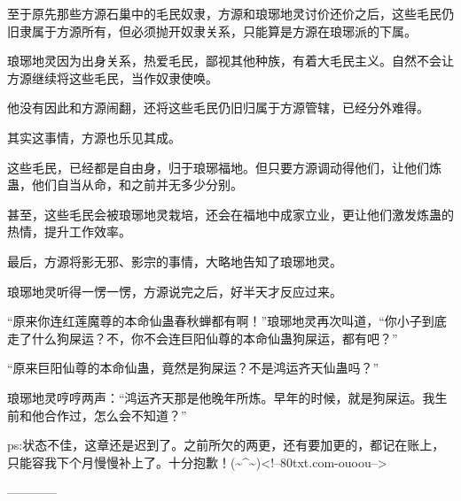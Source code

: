 \begin{this_body}
至于原先那些方源石巢中的毛民奴隶，方源和琅琊地灵讨价还价之后，这些毛民仍旧隶属于方源所有，但必须抛开奴隶关系，只能算是方源在琅琊派的下属。

琅琊地灵因为出身关系，热爱毛民，鄙视其他种族，有着大毛民主义。自然不会让方源继续将这些毛民，当作奴隶使唤。

他没有因此和方源闹翻，还将这些毛民仍旧归属于方源管辖，已经分外难得。

其实这事情，方源也乐见其成。

这些毛民，已经都是自由身，归于琅琊福地。但只要方源调动得他们，让他们炼蛊，他们自当从命，和之前并无多少分别。

甚至，这些毛民会被琅琊地灵栽培，还会在福地中成家立业，更让他们激发炼蛊的热情，提升工作效率。

最后，方源将影无邪、影宗的事情，大略地告知了琅琊地灵。

琅琊地灵听得一愣一愣，方源说完之后，好半天才反应过来。

“原来你连红莲魔尊的本命仙蛊春秋蝉都有啊！”琅琊地灵再次叫道，“你小子到底走了什么狗屎运？不，你不会连巨阳仙尊的本命仙蛊狗屎运，都有吧？”

“原来巨阳仙尊的本命仙蛊，竟然是狗屎运？不是鸿运齐天仙蛊吗？”

琅琊地灵哼哼两声：“鸿运齐天那是他晚年所炼。早年的时候，就是狗屎运。我生前和他合作过，怎么会不知道？”

ps:状态不佳，这章还是迟到了。之前所欠的两更，还有要加更的，都记在账上，只能容我下个月慢慢补上了。十分抱歉！(\~{}\^{}\~{})<!--80txt.com-ouoou-->

------------

\end{this_body}


